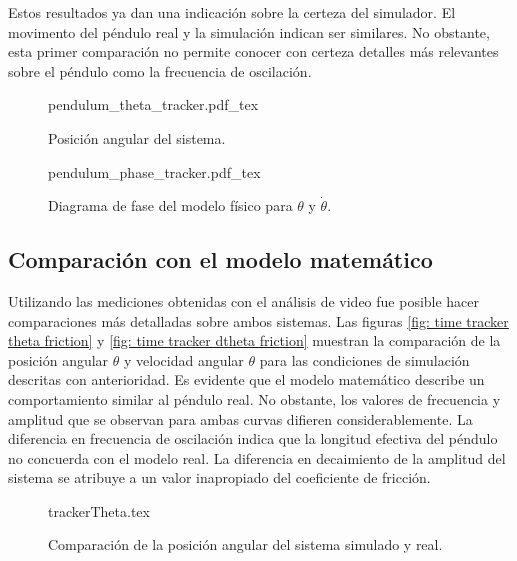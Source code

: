 Estos resultados ya dan una indicación sobre la certeza del simulador.
El movimento del péndulo real y la simulación indican ser similares.
No obstante, esta primer comparación no permite conocer con certeza 
detalles más relevantes sobre el péndulo como la frecuencia de oscilación.

\begin{figure}[htb!]
 \centering
{pendulum_theta_tracker.pdf_tex}
 \caption{Posición angular del sistema.}
 \label{fig: tracker theta}
\end{figure}



\begin{figure}[htb!]
\centering
{pendulum_phase_tracker.pdf_tex}
\caption{Diagrama de fase del modelo físico para $\theta$ y $\dot \theta$.}
\label{fig: tracker phase diagram theta dtheta}
\end{figure}

\pagebreak

\subsection{Comparación con el modelo matemático}
Utilizando las mediciones obtenidas con el análisis de video fue posible hacer 
comparaciones más detalladas sobre ambos sistemas.
Las figuras \ref{fig: time tracker theta friction} y \ref{fig: time tracker dtheta friction}
muestran la comparación de la posición angular $\theta$ 
y velocidad angular $\theta$ para las condiciones de simulación descritas
con anterioridad.
Es evidente que el modelo matemático describe un comportamiento similar al 
péndulo real.
No obstante, los valores de frecuencia y amplitud que se observan para ambas curvas
difieren considerablemente.
La diferencia en frecuencia de oscilación indica que la longitud efectiva 
del péndulo no concuerda con el modelo real.
La diferencia en decaimiento de la amplitud del sistema se atribuye a un valor 
inapropiado del coeficiente de fricción.

\begin{figure}[htb!]
 \centering
{trackerTheta.tex}
 \caption{Comparación de la posición angular del sistema simulado y real.}
 \label{fig: time tracker theta}
\end{figure}

